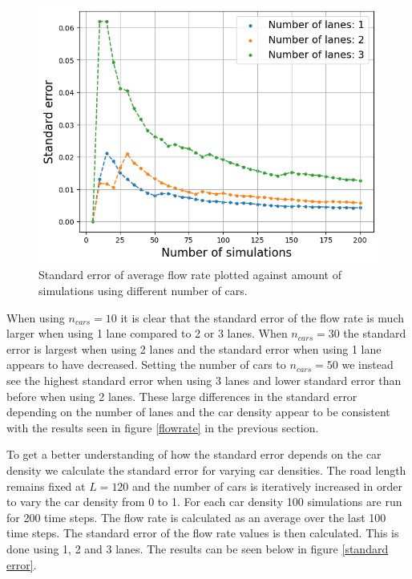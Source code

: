 \documentclass[a4paper,12pt]{article}
\begin{document}
\begin{figure}[H]
\begin{minipage}{.5\textwidth}
        \includegraphics[scale=0.47]{Images/standard error 50 cars 120.png}
    \end{minipage}%
    \caption{Standard error of average flow rate plotted against amount of simulations using different number of cars.}
    \label{standard error 1}
\end{figure}

When using $n_{cars}=10$ it is clear that the standard error of the flow rate is much larger when using 1 lane compared to 2 or 3 lanes.
When $n_{cars}=30$ the standard error is largest when using 2 lanes and the standard error when using 1 lane appears to have decreased.
Setting the number of cars to $n_{cars}=50$ we instead see the highest standard error when using 3 lanes and lower standard error than before 
when using 2 lanes. These large differences in the standard error depending on the number of lanes and the car density appear to 
be consistent with the results seen in figure \ref*{flowrate} in the previous section.

To get a better understanding of how the standard error depends on the car density we calculate the standard error for varying car densities.
The road length remains fixed at $L=120$ and the number of cars is iteratively increased in order to vary the car density from 0 to 1. For each car density 100 simulations are run
for 200 time steps. The flow rate is calculated as an average over the last 100 time steps. The standard error of the flow rate values is then calculated.
This is done using 1, 2 and 3 lanes. The results can be seen below in figure \ref*{standard error}.
\end{document}
